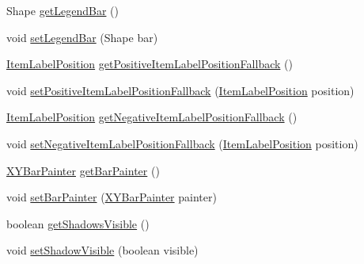 \begin{DoxyCompactItemize}
\item 
Shape \mbox{\hyperlink{classorg_1_1jfree_1_1chart_1_1renderer_1_1xy_1_1_x_y_bar_renderer_a15d92923759411abc18db2dceb623ee8}{get\+Legend\+Bar}} ()
\item 
void \mbox{\hyperlink{classorg_1_1jfree_1_1chart_1_1renderer_1_1xy_1_1_x_y_bar_renderer_ac88695bf22df4b9ed1a250fdf23639c1}{set\+Legend\+Bar}} (Shape bar)
\item 
\mbox{\hyperlink{classorg_1_1jfree_1_1chart_1_1labels_1_1_item_label_position}{Item\+Label\+Position}} \mbox{\hyperlink{classorg_1_1jfree_1_1chart_1_1renderer_1_1xy_1_1_x_y_bar_renderer_aef50803eeebe109e0a137245d5099f76}{get\+Positive\+Item\+Label\+Position\+Fallback}} ()
\item 
void \mbox{\hyperlink{classorg_1_1jfree_1_1chart_1_1renderer_1_1xy_1_1_x_y_bar_renderer_ac50ea70166531d36a013b4f600c90584}{set\+Positive\+Item\+Label\+Position\+Fallback}} (\mbox{\hyperlink{classorg_1_1jfree_1_1chart_1_1labels_1_1_item_label_position}{Item\+Label\+Position}} position)
\item 
\mbox{\hyperlink{classorg_1_1jfree_1_1chart_1_1labels_1_1_item_label_position}{Item\+Label\+Position}} \mbox{\hyperlink{classorg_1_1jfree_1_1chart_1_1renderer_1_1xy_1_1_x_y_bar_renderer_a3997bb98cb08e43cf7c36bfd82e9b705}{get\+Negative\+Item\+Label\+Position\+Fallback}} ()
\item 
void \mbox{\hyperlink{classorg_1_1jfree_1_1chart_1_1renderer_1_1xy_1_1_x_y_bar_renderer_ae75032392dda175fb9440309d6d84c9a}{set\+Negative\+Item\+Label\+Position\+Fallback}} (\mbox{\hyperlink{classorg_1_1jfree_1_1chart_1_1labels_1_1_item_label_position}{Item\+Label\+Position}} position)
\item 
\mbox{\hyperlink{interfaceorg_1_1jfree_1_1chart_1_1renderer_1_1xy_1_1_x_y_bar_painter}{X\+Y\+Bar\+Painter}} \mbox{\hyperlink{classorg_1_1jfree_1_1chart_1_1renderer_1_1xy_1_1_x_y_bar_renderer_aee4b0ac150028ad2139eb895604c4e29}{get\+Bar\+Painter}} ()
\item 
void \mbox{\hyperlink{classorg_1_1jfree_1_1chart_1_1renderer_1_1xy_1_1_x_y_bar_renderer_a82f664290f53118f33737b58caa552e3}{set\+Bar\+Painter}} (\mbox{\hyperlink{interfaceorg_1_1jfree_1_1chart_1_1renderer_1_1xy_1_1_x_y_bar_painter}{X\+Y\+Bar\+Painter}} painter)
\item 
boolean \mbox{\hyperlink{classorg_1_1jfree_1_1chart_1_1renderer_1_1xy_1_1_x_y_bar_renderer_a48f7a0794b8a940e7df29403ccf17230}{get\+Shadows\+Visible}} ()
\item 
void \mbox{\hyperlink{classorg_1_1jfree_1_1chart_1_1renderer_1_1xy_1_1_x_y_bar_renderer_aa5b0e04cebea57af1bcbf9193c007456}{set\+Shadow\+Visible}} (boolean visible)

\end{DoxyCompactItemize}
